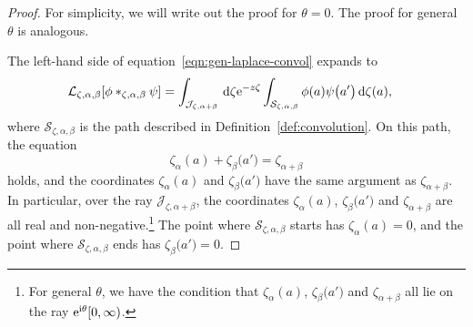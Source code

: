 \documentclass[pdftex]{sigma}
\newcommand{\laplace}{\mathcal{L}}
\numberwithin{equation}{section}
\begin{document}
\begin{proof}
For simplicity, we will write out the proof for $\theta = 0$. The proof for general $\theta$ is analogous.

The left-hand side of equation~\eqref{eqn:gen-laplace-convol} expands to
\begin{align*}
\laplace_{\zeta,\alpha,\beta}[\phi \ast_{\zeta,\alpha, \beta} \psi] &= \int_{\mathcal{J}_{\zeta, \alpha+\beta}} \,{\rm d}\zeta {\rm e}^{-z\zeta}\int_{\mathcal{S}_{\zeta,\alpha,\beta}} \phi(a) \psi\bigl(a'\bigr) \,{\rm d}\zeta(a),
\end{align*}
where $\mathcal{S}_{\zeta, \alpha, \beta}$ is the path described in Definition~\ref{def:convolution}. On this path, the equation
\begin{equation}\label{eq:slice-plane}
\zeta_\alpha(a) + \zeta_\beta\bigl(a'\bigr) = \zeta_{\alpha+\beta}
\end{equation}
holds, and the coordinates $\zeta_\alpha(a)$ and $\zeta_\beta\bigl(a'\bigr)$ have the same argument as $\zeta_{\alpha+\beta}$. In particular, over the ray $\mathcal{J}_{\zeta, \alpha+\beta}$, the coordinates $\zeta_\alpha(a)$, $\zeta_\beta\bigl(a'\bigr)$ and $\zeta_{\alpha+\beta}$ are all real and non-negative.\footnote{For general $\theta$, we have the condition that $\zeta_\alpha(a)$, $\zeta_\beta\bigl(a'\bigr)$ and $\zeta_{\alpha+\beta}$ all lie on the ray ${\rm e}^{{\rm i}\theta}[0, \infty)$.} The point where $\mathcal{S}_{\zeta, \alpha, \beta}$ starts has $\zeta_\alpha(a) = 0$, and the point where $\mathcal{S}_{\zeta, \alpha, \beta}$ ends has $\zeta_\beta\bigl(a'\bigr) = 0$.


\end{proof}
\end{document}
